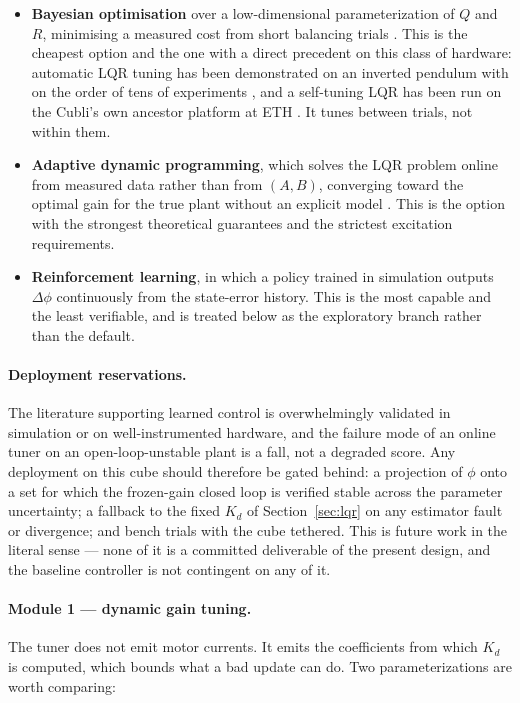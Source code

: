 \begin{itemize}
    \item \textbf{Bayesian optimisation} over a low-dimensional
    parameterization of $Q$ and $R$, minimising a measured cost from short
    balancing trials \cite{shahriari2016bayesopt}. This is the cheapest option
    and the one with a direct precedent on this class of hardware: automatic
    LQR tuning has been demonstrated on an inverted pendulum with on the order
    of tens of experiments \cite{marco2016automaticlqr}, and a self-tuning LQR
    has been run on the Cubli's own ancestor platform at ETH
    \cite{trimpe2014learningcubli}. It tunes between trials, not within them.
    \item \textbf{Adaptive dynamic programming}, which solves the LQR problem
    online from measured data rather than from $(A,B)$, converging toward the
    optimal gain for the true plant without an explicit model
    \cite{lewis2012adp}. This is the option with the strongest theoretical
    guarantees and the strictest excitation requirements.
    \item \textbf{Reinforcement learning}, in which a policy trained in
    simulation outputs $\Delta\phi$ continuously from the state-error history.
    This is the most capable and the least verifiable, and is treated below as
    the exploratory branch rather than the default.
\end{itemize}

\paragraph{Deployment reservations.} The literature supporting learned control
is overwhelmingly validated in simulation or on well-instrumented hardware,
and the failure mode of an online tuner on an open-loop-unstable plant is a
fall, not a degraded score. Any deployment on this cube should therefore be
gated behind: a projection of $\phi$ onto a set for which the frozen-gain
closed loop is verified stable across the parameter uncertainty; a fallback to
the fixed $K_d$ of Section~\ref{sec:lqr} on any estimator fault or
divergence; and bench trials with the cube tethered. This is future work in
the literal sense --- none of it is a committed deliverable of the present
design, and the baseline controller is not contingent on any of it.

\paragraph{Module 1 --- dynamic gain tuning.} The tuner does not emit motor currents. It emits the coefficients from which
$K_d$ is computed, which bounds what a bad update can do. Two
parameterizations are worth comparing:

